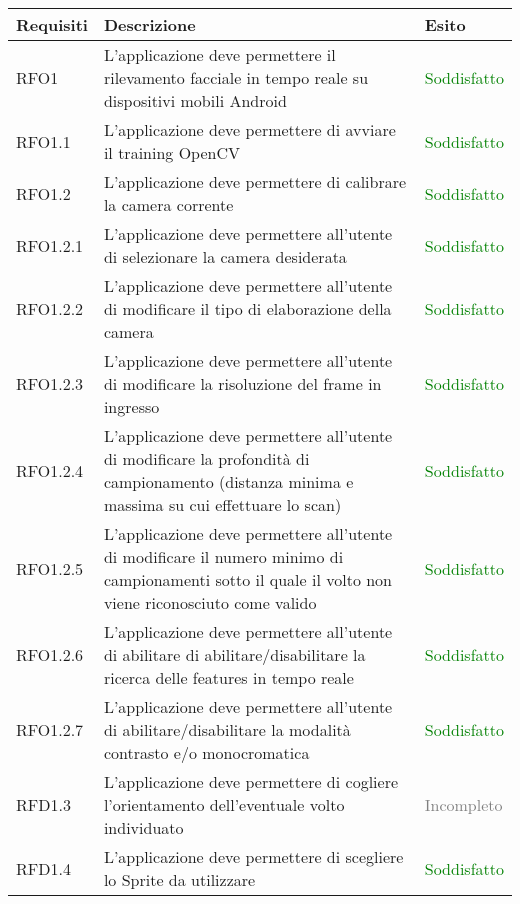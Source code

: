 \begin{center}
    \begin{longtable}{ | p{2cm} | p{7cm} | p{2cm} |}
    \hline
    Requisiti & Descrizione & Esito \\ \hline
    RFO1 &  L'applicazione deve permettere il rilevamento facciale in tempo reale su dispositivi mobili Android & \textcolor{green}{Soddisfatto}  \\ \hline 
    RFO1.1 &  L'applicazione deve permettere di avviare il training OpenCV  & \textcolor{green}{Soddisfatto} \\ \hline
    RFO1.2 &  L'applicazione deve permettere di calibrare la camera corrente  & \textcolor{green}{Soddisfatto}  \\ \hline 
    RFO1.2.1 &  L'applicazione deve permettere all'utente di selezionare la camera desiderata & \textcolor{green}{Soddisfatto} \\ \hline
    RFO1.2.2 &  L'applicazione deve permettere all'utente di modificare il tipo di elaborazione della camera & \textcolor{green}{Soddisfatto} \\ \hline
    RFO1.2.3 &  L'applicazione deve permettere all'utente di modificare la risoluzione del frame in ingresso & \textcolor{green}{Soddisfatto}  \\ \hline
    RFO1.2.4 &  L'applicazione deve permettere all'utente di modificare la profondità di campionamento (distanza minima e massima su cui effettuare lo scan) & \textcolor{green}{Soddisfatto}  \\ \hline
    RFO1.2.5 &  L'applicazione deve permettere all'utente di modificare il numero minimo di campionamenti sotto il quale il volto non viene riconosciuto come valido  & \textcolor{green}{Soddisfatto}  \\ \hline
    RFO1.2.6 &  L'applicazione deve permettere all'utente di abilitare di abilitare/disabilitare la ricerca delle features in tempo reale  & \textcolor{green}{Soddisfatto}  \\ \hline
    RFO1.2.7 &  L'applicazione deve permettere all'utente di abilitare/disabilitare la modalità contrasto e/o monocromatica  & \textcolor{green}{Soddisfatto}  \\ \hline
    RFD1.3 &  L'applicazione deve permettere di cogliere l'orientamento dell'eventuale volto individuato & \textcolor{gray}{Incompleto} \\ \hline    
    RFD1.4 &  L'applicazione deve permettere di scegliere lo Sprite da utilizzare & \textcolor{green}{Soddisfatto} \\ \hline    

\end{longtable}
\end{center}

